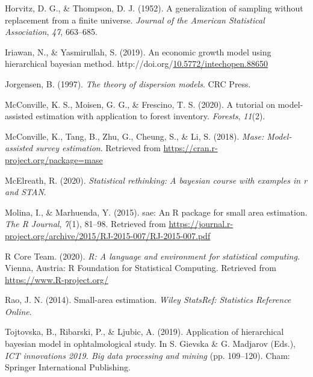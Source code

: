 \documentclass[12pt,twoside]{reedthesis}
\newlength{\cslhangindent}
\newenvironment{CSLReferences}[2] %
 {%
  \setlength{\parindent}{0pt}
  \ifodd #1 \everypar{\setlength{\hangindent}{\cslhangindent}}\ignorespaces\fi
  \ifnum #2 > 0
  \setlength{\parskip}{#2\baselineskip}
  \fi
 }%
 {}
\begin{document}
\begin{CSLReferences}{1}{0}
\leavevmode{}%
Horvitz, D. G., \& Thompson, D. J. (1952). A generalization of sampling without replacement from a finite universe. \emph{Journal of the American Statistical Association}, \emph{47}, 663--685.

\leavevmode{}%
Iriawan, N., \& Yasmirullah, S. (2019). An economic growth model using hierarchical bayesian method. http://doi.org/\href{https://doi.org/10.5772/intechopen.88650}{10.5772/intechopen.88650}

\leavevmode{}%
Jorgensen, B. (1997). \emph{The theory of dispersion models}. CRC Press.

\leavevmode{}%
McConville, K. S., Moisen, G. G., \& Frescino, T. S. (2020). A tutorial on model-assisted estimation with application to forest inventory. \emph{Forests}, \emph{11}(2).

\leavevmode{}%
McConville, K., Tang, B., Zhu, G., Cheung, S., \& Li, S. (2018). \emph{Mase: Model-assisted survey estimation}. Retrieved from \url{https://cran.r-project.org/package=mase}

\leavevmode{}%
McElreath, R. (2020). \emph{Statistical rethinking: A bayesian course with examples in r and STAN}.

\leavevmode{}%
Molina, I., \& Marhuenda, Y. (2015). {sae}: An {R} package for small area estimation. \emph{The R Journal}, \emph{7}(1), 81--98. Retrieved from \url{https://journal.r-project.org/archive/2015/RJ-2015-007/RJ-2015-007.pdf}

\leavevmode{}%
R Core Team. (2020). \emph{R: A language and environment for statistical computing}. Vienna, Austria: R Foundation for Statistical Computing. Retrieved from \url{https://www.R-project.org/}

\leavevmode{}%
Rao, J. N. (2014). Small-area estimation. \emph{Wiley StatsRef: Statistics Reference Online}.

\leavevmode{}%
Tojtovska, B., Ribarski, P., \& Ljubic, A. (2019). Application of hierarchical bayesian model in ophtalmological study. In S. Gievska \& G. Madjarov (Eds.), \emph{ICT innovations 2019. Big data processing and mining} (pp. 109--120). Cham: Springer International Publishing.


\end{CSLReferences}
\end{document}
